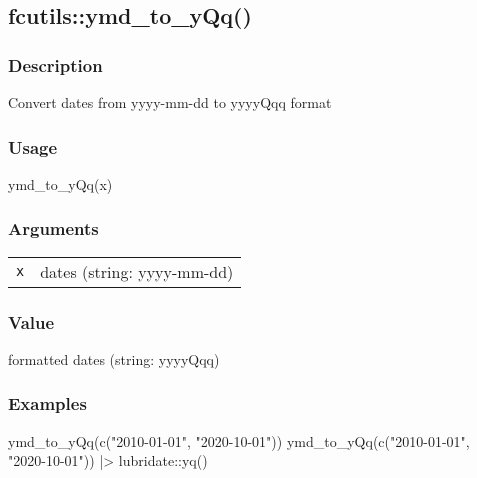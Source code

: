 \documentclass[
  letterpaper,
  DIV=11,
  numbers=noendperiod]{scrreport}
\newenvironment{Shaded}{\begin{snugshade}}{\end{snugshade}}
\newcommand{\FunctionTok}[1]{\textcolor[rgb]{0.28,0.35,0.67}{#1}}
\newcommand{\NormalTok}[1]{\textcolor[rgb]{0.00,0.23,0.31}{#1}}
\newcommand{\SpecialCharTok}[1]{\textcolor[rgb]{0.37,0.37,0.37}{#1}}
\newcommand{\StringTok}[1]{\textcolor[rgb]{0.13,0.47,0.30}{#1}}
\begin{document}
\subsection{fcutils::ymd\_to\_yQq()}\label{fcutilsymd_to_yqq}

\subsubsection{Description}\label{description-24}

Convert dates from yyyy-mm-dd to yyyyQqq format

\subsubsection{Usage}\label{usage-24}

\begin{Shaded}
\begin{Highlighting}[]
\FunctionTok{ymd\_to\_yQq}\NormalTok{(x)}
\end{Highlighting}
\end{Shaded}

\subsubsection{Arguments}\label{arguments-24}

\begin{longtable}[]{@{}ll@{}}
\toprule\noalign{}
\endhead
\bottomrule\noalign{}
\endlastfoot
\texttt{x} & dates (string: yyyy-mm-dd) \\
\end{longtable}

\subsubsection{Value}\label{value-24}

formatted dates (string: yyyyQqq)

\subsubsection{Examples}\label{examples-24}

\begin{Shaded}
\begin{Highlighting}[]
\FunctionTok{ymd\_to\_yQq}\NormalTok{(}\FunctionTok{c}\NormalTok{(}\StringTok{"2010{-}01{-}01"}\NormalTok{, }\StringTok{"2020{-}10{-}01"}\NormalTok{))}
\FunctionTok{ymd\_to\_yQq}\NormalTok{(}\FunctionTok{c}\NormalTok{(}\StringTok{"2010{-}01{-}01"}\NormalTok{, }\StringTok{"2020{-}10{-}01"}\NormalTok{)) }\SpecialCharTok{|\textgreater{}}\NormalTok{ lubridate}\SpecialCharTok{::}\FunctionTok{yq}\NormalTok{()}
\end{Highlighting}
\end{Shaded}
\end{document}
